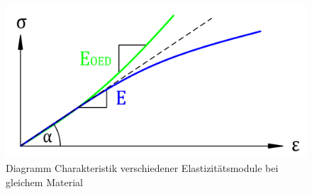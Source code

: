 \begin{figure}
	\centering
	\includegraphics[width=0.45\linewidth,keepaspectratio]{papers/spannung/Grafiken/DiagrammOedometer-Versuch.png}
	\caption{Diagramm Charakteristik verschiedener Elastizitätsmodule bei gleichem Material}
	\label{fig:DiagrammOedometer-Versuch}
\end{figure}